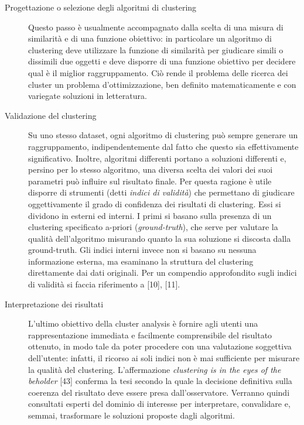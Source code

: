 \begin{description}
\item[Progettazione o selezione degli algoritmi di clustering] Questo passo \`e usualmente accompagnato dalla scelta di una misura di similarit\`a e di una funzione obiettivo: in particolare un algoritmo di clustering deve utilizzare la funzione di similarit\`a per giudicare simili o dissimili due oggetti e deve disporre di una funzione obiettivo per decidere qual \`e il miglior raggruppamento. Ci\`o rende il problema delle ricerca dei cluster un problema d'ottimizzazione, ben definito matematicamente e con variegate soluzioni in letteratura.
\item[Validazione del clustering] Su uno stesso dataset, ogni algoritmo di clustering pu\`o sempre generare un raggruppamento, indipendentemente dal fatto che questo sia effettivamente significativo. Inoltre, algoritmi differenti portano a soluzioni differenti e, persino per lo stesso algoritmo, una diversa scelta dei valori dei suoi parametri pu\`o influire sul risultato finale. Per questa ragione \`e utile disporre di strumenti (detti \textit{indici di validit\`a}) che permettano di giudicare oggettivamente il grado di confidenza dei risultati di clustering. Essi si dividono in esterni ed interni. I primi si basano sulla presenza di un clustering specificato a-priori (\textit{ground-truth}), che serve per valutare la qualit\`a dell'algoritmo misurando quanto la sua soluzione si discosta dalla ground-truth. Gli indici interni invece non si basano su nessuna informazione esterna, ma esaminano la struttura del clustering direttamente dai dati originali. Per un compendio approfondito sugli indici di validit\`a si faccia riferimento a [10], [11].
\item[Interpretazione dei risultati] L'ultimo obiettivo della cluster analysis \`e fornire agli utenti una rappresentazione immediata e facilmente comprensibile del risultato ottenuto, in modo tale da poter procedere con una valutazione soggettiva dell'utente: infatti, il ricorso ai soli indici non \`e mai sufficiente per misurare la qualit\`a del clustering. L'affermazione \textit{clustering is in the eyes of the beholder} [43] conferma la tesi secondo la quale la decisione definitiva sulla coerenza del risultato deve essere presa dall'osservatore. Verranno quindi consultati esperti del dominio di interesse per interpretare, convalidare e, semmai, trasformare le soluzioni proposte dagli algoritmi.
\end{description}

